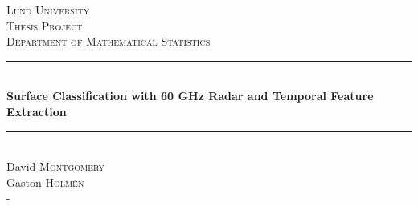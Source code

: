 \begin{titlepage}
\newcommand{\HRule}{\rule{\linewidth}{0.5mm}}

\center
 
\textsc{\LARGE Lund University}\\[1.5cm]
\textsc{\Large Thesis Project}\\[0.5cm]
\textsc{\large Department of Mathematical Statistics}\\[0.5cm]

\HRule \\[0.4cm]
	{ \huge \bfseries Surface Classification with 60 GHz Radar and Temporal Feature Extraction}\\[0.1cm]
\HRule \\[1.5cm]
 

\Large David \textsc{Montgomery} \\
\Large Gaston \textsc{Holm\'en} \\

\vfill-

\end{titlepage}
